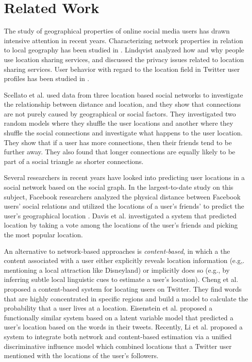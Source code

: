 \documentclass[letterpaper]{article}
\begin{document}
\section{Related Work}
The study of geographical properties of online social media users has drawn intensive attention in recent years. Characterizing network properties in relation to local geography has been studied in \cite{yardi2010tweeting}. Lindqvist \cite{lindqvist2011mayor} analyzed how and why people use location sharing services, and discussed the privacy issues related to location sharing services.  User behavior with regard to the location field in Twitter user profiles has been studied in \cite{hecht2011tweets}.

Scellato et al. \cite{scellato2011socio} used data from three location based social networks to investigate the relationship between distance and location, and they show that connections are not purely caused by geographical or social factors.  They investigated two random models where they shuffle the user locations and another where they shuffle the social connections and investigate what happens to the user location.  They show that if a user has more connections, then their friends tend to be further away.  They also found that longer connections are equally likely to be part of a social triangle as shorter connections.

Several researchers in recent years have looked into predicting user locations in a social network based on the social graph. In the largest-to-date study on this subject, Facebook researchers analyzed the physical distance between Facebook users' social relations and utilized the locations of a user's friends' to predict the user's geographical location \cite{backstrom2010find}. Davis et al. \cite{davis2011infer} investigated a system that predicted location by taking a vote among the locations of the user's friends and picking the most popular location.

An alternative to network-based approaches is \textit{content-based}, in which a the content associated with a user either explicitly reveals location information (e.g,. mentioning a local attraction like Disneyland) or implicitly does so (e.g., by inferring subtle local linguistic cues to estimate a user's location).
%
Cheng et al. \cite{cheng2010you} proposed a content-based system for locating users on Twitter. They find words that are highly concentrated in specific regions and build a model to calculate the probability that a user lives at a location.
%
Eisenstein et al. \cite{eisenstein2010latent} proposed a functionally similar system based on a latent variable model that predicted a user's location based on the words in their tweets.
%
Recently, Li et al. \cite{li2012towards} proposed a system to integrate both network and content-based estimation via a unified discriminative influence model which combined locations that a Twitter user mentioned with the locations of the user's followers.
\end{document}
